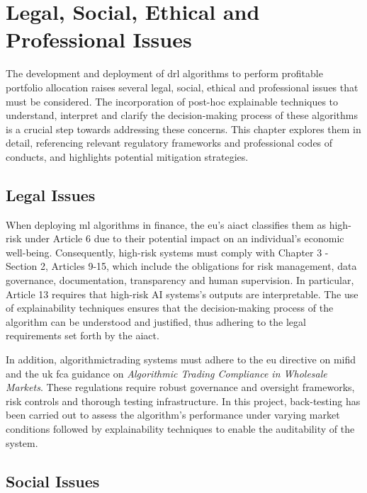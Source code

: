 \chapter{Legal, Social, Ethical and Professional Issues} \label{ch:issues}

The development and deployment of \acrfull{drl} algorithms to perform profitable portfolio allocation raises several legal, social, ethical and professional issues that must be considered. The incorporation of post-hoc explainable techniques to understand, interpret and clarify the decision-making process of these algorithms is a crucial step towards addressing these concerns. This chapter explores them in detail, referencing relevant regulatory frameworks and professional codes of conducts, and highlights potential mitigation strategies.

\section{Legal Issues} \label{sec:legal-issues}

When deploying \acrfull{ml} algorithms in finance, the \acrfull{eu}'s \acrfull{aiact} \cite{AIAct2024} classifies them as high-risk under Article 6 due to their potential impact on an individual's economic well-being. Consequently, high-risk systems must comply with Chapter 3 - Section 2, Articles 9-15, which include the obligations for risk management, data governance, documentation, transparency and human supervision. In particular, Article 13 requires that high-risk AI systems's outputs are interpretable. The use of explainability techniques ensures that the decision-making process of the algorithm can be understood and justified, thus adhering to the legal requirements set forth by the \acrshort{aiact}.

In addition, \gls{algorithmictrading} systems must adhere to the \acrlong{eu} directive on \acrfull{mifid} \cite{MiFIDII} and the \acrfull{uk} \acrfull{fca} guidance on \textit{Algorithmic Trading Compliance in Wholesale Markets}. These regulations require robust governance and oversight frameworks, risk controls and thorough testing infrastructure. In this project, back-testing has been carried out to assess the algorithm's performance under varying market conditions followed by explainability techniques to enable the auditability of the system.

\section{Social Issues} \label{sec:social-issues}

